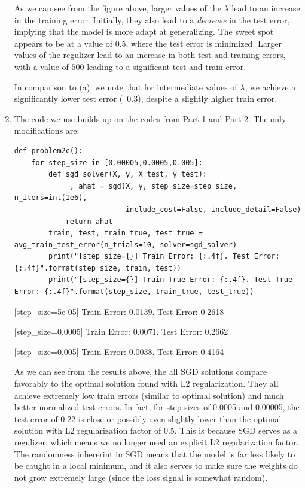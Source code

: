 \documentclass[12pt]{article}
\begin{document}
\begin{enumerate}[label=(\alph*)]
    As we can see from the figure above, larger values of the $\lambda$ lead to an increase in the training error. Initially, they also lead to a \textit{decrease} in the test error, implying that the model is more adapt at generalizing. The sweet spot appears to be at a value of 0.5, where the test error is minimized. Larger values of the regulizer lead to an increase in both test and training errors, with a value of $500$ leading to a significant test and train error.

    In comparison to (a), we note that for intermediate values of $\lambda$, we achieve a significantly lower test error (~0.3), despite a slightly higher train error.

  \item
    The code we use builds up on the codes from Part 1 and Part 2. The only modifications are:
    \begin{verbatim}
def problem2c():
    for step_size in [0.00005,0.0005,0.005]:
        def sgd_solver(X, y, X_test, y_test):
            _, ahat = sgd(X, y, step_size=step_size, n_iters=int(1e6),
                          include_cost=False, include_detail=False)
            return ahat
        train, test, train_true, test_true = avg_train_test_error(n_trials=10, solver=sgd_solver)
        print("[step_size={}] Train Error: {:.4f}. Test Error: {:.4f}".format(step_size, train, test))
        print("[step_size={}] Train True Error: {:.4f}. Test True Error: {:.4f}".format(step_size, train_true, test_true))
      \end{verbatim}

      [step\_size=5e-05] Train Error: 0.0139. Test Error: 0.2618
      
      [step\_size=0.0005] Train Error: 0.0071. Test Error: 0.2662
      
      [step\_size=0.005] Train Error: 0.0038. Test Error: 0.4164


      As we can see from the results above, the all SGD solutions compare favorably to the optimal solution found with L2 regularization. They all achieve extremely low train errors (similar to optimal solution) and much better normalized test errors. In fact, for step sizes of 0.0005 and 0.00005, the test error of 0.22 is close or possibly even slightly lower than the optimal solution with L2 regularization factor of 0.5. This is because SGD serves as a regulizer, which means we no longer need an explicit L2 regularization factor. The randomness inhererint in SGD means that the model is far less likely to be caught in a local minimum, and it also serves to make sure the weights do not grow extremely large (since the loss signal is somewhat random).


\end{enumerate}
\end{document}
